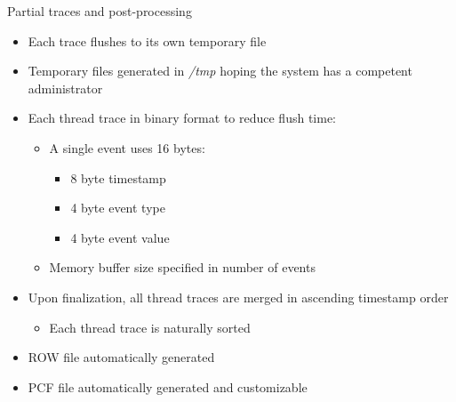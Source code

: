 \documentclass{beamer}
\begin{document}
\begin{frame}{Partial traces and post-processing}
  \begin{itemize}
    \item Each trace flushes to its own temporary file
    \item Temporary files generated in \emph{/tmp} hoping the system
    has a competent administrator
    \item Each thread trace in binary format to reduce flush time:
    \begin{itemize}
      \item A single event uses 16 bytes:
      \begin{itemize}
        \item 8 byte timestamp
        \item 4 byte event type
        \item 4 byte event value
      \end{itemize}
      \item Memory buffer size specified in number of events
    \end{itemize}
    \item Upon finalization, all thread traces are merged in ascending timestamp
    order
      \begin{itemize}
        \item Each thread trace is naturally sorted
      \end{itemize}
    \item ROW file automatically generated
    \item PCF file automatically generated and customizable
  \end{itemize}
\end{frame}
\end{document}
